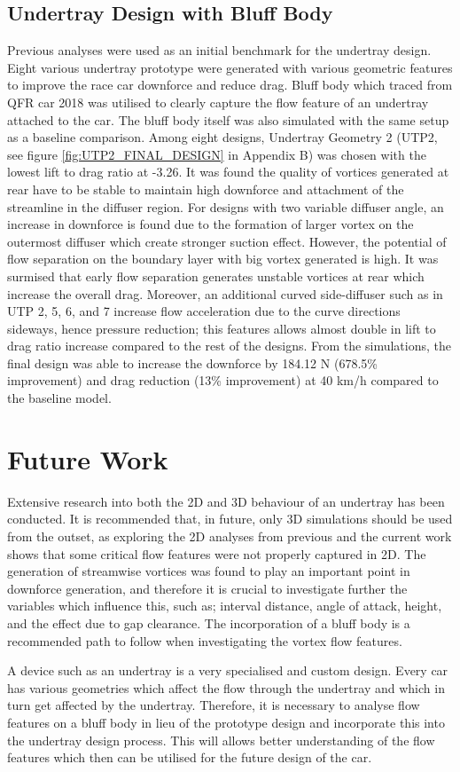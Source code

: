 \subsection{Undertray Design with Bluff Body}
Previous analyses were used as an initial benchmark for the undertray design. Eight various undertray prototype were generated with various geometric features to improve the race car downforce and reduce drag. Bluff body which traced from QFR car 2018 was utilised to clearly capture the flow feature of an undertray attached to the car. The bluff body itself was also simulated with the same setup as a baseline comparison. Among eight designs, Undertray Geometry 2 (UTP2, see figure \ref{fig:UTP2_FINAL_DESIGN} in Appendix B) was chosen with the lowest lift to drag ratio at -3.26. It was found the quality of vortices generated at rear have to be stable to maintain high downforce and attachment of the streamline in the diffuser region. For designs with two variable diffuser angle, an increase in downforce is found due to the formation of larger vortex on the outermost diffuser which create stronger suction effect. However, the potential of flow separation on the boundary layer with big vortex generated is high. It was surmised that early flow separation generates unstable vortices at rear which increase the overall drag. Moreover, an additional curved side-diffuser such as in UTP 2, 5, 6, and 7 increase flow acceleration due to the curve directions sideways, hence pressure reduction; this features allows almost double in lift to drag ratio increase compared to the rest of the designs. From the simulations, the final design was able to increase the downforce by 184.12 N (678.5\% improvement) and drag reduction  (13\% improvement) at 40 km/h compared to the baseline model.


\section{Future Work}
\noindent Extensive research into both the 2D and 3D behaviour of an undertray has been conducted. It is recommended that, in future, only 3D simulations should be used from the outset, as exploring the 2D analyses from previous and the current work shows that some critical flow features were not properly captured in 2D. The generation of streamwise vortices was found to play an important point in downforce generation, and therefore it is crucial to investigate further the variables which influence this, such as; interval distance, angle of attack, height, and the effect due to gap clearance. The incorporation of a bluff body is a recommended path to follow when investigating the vortex flow features.

\noindent A device such as an undertray is a very specialised and custom design. Every car has various geometries which affect the flow through the undertray and which in turn get affected by the undertray. Therefore, it is necessary to analyse flow features on a bluff body in lieu of the prototype design and incorporate this into the undertray design process. This will allows better understanding of the flow features which then can be utilised for the future design of the car.

